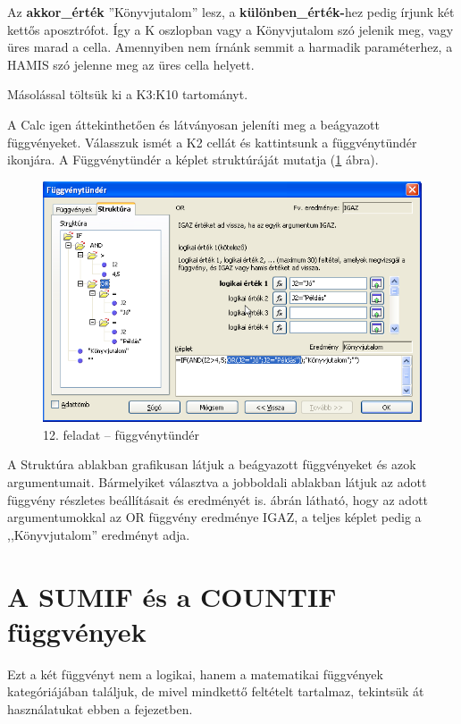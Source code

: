 Az \textbf{akkor\_érték} ''Könyvjutalom'' lesz, a
\textbf{különben\_érték-}hez pedig írjunk két kettős
aposztrófot. Így a K oszlopban vagy a Könyvjutalom szó jelenik
meg, vagy üres marad a cella. Amennyiben nem írnánk semmit a
harmadik paraméterhez, a HAMIS szó jelenne meg az üres cella
helyett.

Másolással töltsük ki a K3:K10 tartományt.

A Calc igen áttekinthetően és látványosan jeleníti meg a
beágyazott függvényeket. Válasszuk ismét a K2 cellát és
kattintsunk a függvénytündér ikonjára. A
Függvénytündér a képlet struktúráját mutatja
(\ref{12-feladatFüggvénytündér} ábra).

\begin{figure}[!h]
\begin{center}
\includegraphics[width=13.999cm]{oocalcv1-img72.png}
\caption{12. feladat --  függvénytündér}\label{12-feladatFüggvénytündér}
\end{center}
\end{figure}

A Struktúra ablakban grafikusan látjuk a beágyazott
függvényeket és azok argumentumait.  Bármelyiket választva a
jobboldali ablakban látjuk az adott függvény részletes
beállításait és   eredményét is.  ábrán
látható, hogy az adott argumentumokkal az OR függvény
eredménye IGAZ, a teljes képlet pedig a
,,Könyvjutalom'' eredményt
adja.

\section[A SUMIF és a COUNTIF függvények]{A SUMIF és a
COUNTIF függvények}

Ezt a két függvényt nem a logikai, hanem a matematikai
függvények kategóriájában találjuk, de mivel mindkettő
feltételt tartalmaz, tekintsük át használatukat ebben a
fejezetben.

